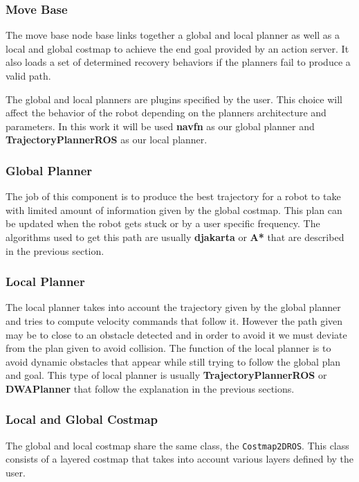 \subsubsection{Move Base}

The move base node base links together a global and local planner as well as a local and global costmap to achieve the end goal provided by an action server. It also loads a set of determined recovery behaviors if the planners fail to produce a valid path. 

The global and local planners are plugins specified by the user. This choice will affect the behavior of the robot depending on the planners architecture and parameters. In this work it will be used \textbf{navfn} as our global planner and \textbf{TrajectoryPlannerROS} as our local planner.

\subsubsection{Global Planner}
 
The job of this component is to produce the best trajectory for a robot to take with limited amount of information given by the global costmap.
This plan can be updated when the robot gets stuck or by a user specific frequency. The algorithms used to get this path are usually \textbf{djakarta} or \textbf{A*} that are described in the previous section.

\subsubsection{Local Planner}
The local planner takes into account the trajectory given by the global planner and tries to compute velocity commands that follow it. However the path given may be to close to an obstacle detected and in order to avoid it we must deviate from the plan given to avoid collision. The function of the local planner is to avoid dynamic obstacles that appear while still trying to follow the global plan and goal. This type of local planner is usually \textbf{TrajectoryPlannerROS} or \textbf{DWAPlanner} that follow the explanation in the previous sections.
\subsubsection{Local and Global Costmap}
The global and local costmap share the same class, the  \texttt{Costmap2DROS}. This class consists of a layered costmap that takes into account various layers defined by the user.

